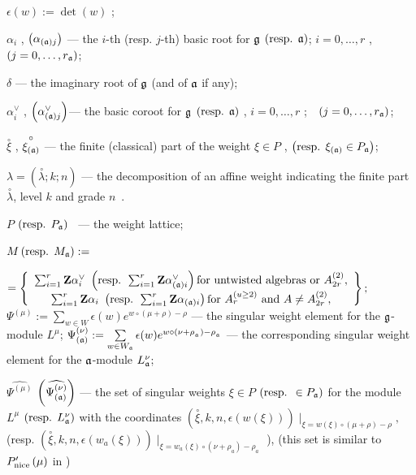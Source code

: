 \documentclass[a4paper,12pt]{article}
\theoremstyle{definition} \newtheorem{Def}{Definition}
\newcommand{\co}[1]{\overset{\circ }{#1}}
\begin{document}
$\epsilon \left( w\right) :=\det \left( w\right) $ ;

$\alpha _{i}$ , $\left( \alpha _{\left( \frak{a}\right) j}\right) $ --- the $i
$-th (resp. $j$-th) basic root for $\frak{g}$ $\left( \text{resp. }\frak{a}%
\right) $; $i=0,\ldots ,r$ ,\ \ $\left( j=0,\ldots ,r_{\frak{a}}\right) $;

$\delta $ --- the imaginary root of $\frak{g}$ (and of $\frak{a}$ if any);

$\alpha _{i}^{\vee }$ , $\left( \alpha _{\left( \frak{a}\right) j}^{\vee
}\right) $--- the basic coroot for $\frak{g}$ $\left( \text{resp. }\frak{a}%
\right) $ , $i=0,\ldots ,r$ ;\ \ $\left( j=0,\ldots ,r_{\frak{a}}\right) $;

$\co{\xi }$ , $\co{\xi _{\left( \frak{a}\right) }}$
--- the finite (classical) part of the weight $\xi \in P$ , $\left( \text{%
resp. }\xi _{\left( \frak{a}\right) }\in P_{\frak{a}}\right) $;

$\lambda =\left( \co{\lambda };k;n\right) $ --- the
decomposition of an affine weight indicating the finite part $\co{\lambda }$, level $k$ and grade $n$\ .

$P$ $\left( \text{resp. } P_{\frak{a}}\right) $ \ --- the weight lattice;

$M \left( \text{resp. }M_{\frak{a}}\right) :=$

\noindent $=\left\{
\begin{array}{c}
\sum_{i=1}^{r}\mathbf{Z}\alpha _{i}^{\vee }\text{ }\left( \text{resp. }%
\sum_{i=1}^{r}\mathbf{Z}\alpha _{\left( \frak{a}\right) i}^{\vee }\right)
\text{for untwisted algebras or }A_{2r}^{\left( 2\right) }, \\
\sum_{i=1}^{r}\mathbf{Z}\alpha _{i}\text{ }\left( \text{resp. }\sum_{i=1}^{r}%
\mathbf{Z}\alpha _{\left( \frak{a}\right) i}\right) \text{for }A_{r}^{\left(
u\geq 2\right) }\text{ and }A\neq A_{2r}^{\left( 2\right) },
\end{array}
\right\} ;$
$\Psi ^{\left( \mu \right) }:=\sum\limits_{w\in W}\epsilon (w)e^{w\circ (\mu +\rho )-\rho }$ --- the singular weight element for the $\frak{g}$-module $L^{\mu }$;
$\Psi _{\left( \frak{a}\right) }^{\left( \nu \right) }:=\sum\limits_{w\in W_{\frak{a}}}\epsilon (w)e^{w\circ (\nu +\rho
_{_{\frak{a}}})-\rho _{_{\frak{a}}}}$ --- the corresponding singular weight
element for the $\frak{a}$-module $L_{\frak{a}}^{\nu }$;

$\widehat{\Psi ^{\left( \mu \right) }}$ $\left( \widehat{\Psi _{\left( \frak{%
a}\right) }^{\left( \nu \right) }}\right) $ --- the set of singular weights $%
\xi \in P$ $\left( \text{resp. }\in P_{\frak{a}}\right) $ for the module $%
L^{\mu }$ $\left( \text{resp. }L_{\frak{a}}^{\nu }\right) $ with the
coordinates $\left( \co{\xi },k,n,\epsilon \left( w\left( \xi
\right) \right) \right) \mid _{\xi =w\left( \xi \right) \circ (\mu +\rho
)-\rho },$ (resp. $\left( \co{\xi },k,n,\epsilon \left(
w_{a}\left( \xi \right) \right) \right) \mid _{\xi =w_{a}\left( \xi \right)
\circ (\nu +\rho _{a})-\rho _{a}}$ ), (this set is similar to $P_{\mathrm{%
nice}}^{\prime }\left( \mu \right) $ in \cite{wakimoto2001idl})
\end{document}
